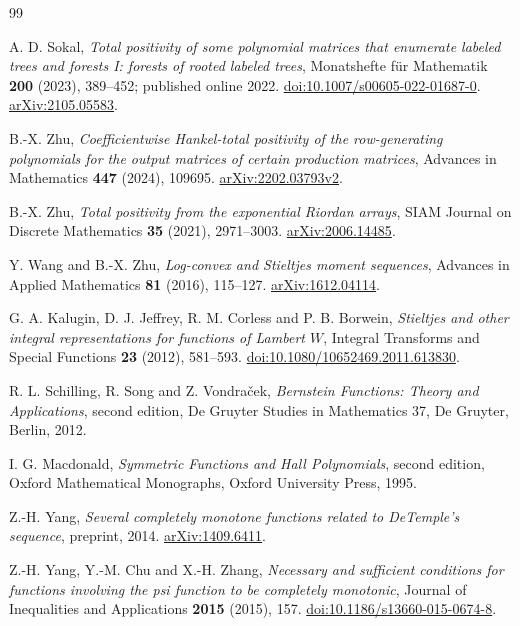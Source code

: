 \documentclass[11pt,a4paper]{article}
\theoremstyle{definition}
\theoremstyle{remark}
\numberwithin{equation}{section}
\begin{document}
\begin{thebibliography}{99}
\setlength{\itemsep}{2pt plus .3pt minus .3pt}

A. D. Sokal,
\emph{Total positivity of some polynomial matrices that enumerate labeled
trees and forests I: forests of rooted labeled trees},
Monatshefte f\"ur Mathematik \textbf{200} (2023), 389--452;
published online 2022.
\href{https://doi.org/10.1007/s00605-022-01687-0}{doi:10.1007/s00605-022-01687-0}.
\href{https://arxiv.org/abs/2105.05583}{arXiv:2105.05583}.

B.-X. Zhu,
\emph{Coefficientwise Hankel-total positivity of the row-generating
polynomials for the output matrices of certain production matrices},
Advances in Mathematics \textbf{447} (2024), 109695.
\href{https://arxiv.org/abs/2202.03793v2}{arXiv:2202.03793v2}.

B.-X. Zhu,
\emph{Total positivity from the exponential Riordan arrays},
SIAM Journal on Discrete Mathematics \textbf{35} (2021), 2971--3003.
\href{https://arxiv.org/abs/2006.14485}{arXiv:2006.14485}.

Y. Wang and B.-X. Zhu,
\emph{Log-convex and Stieltjes moment sequences},
Advances in Applied Mathematics \textbf{81} (2016), 115--127.
\href{https://arxiv.org/abs/1612.04114}{arXiv:1612.04114}.

G. A. Kalugin, D. J. Jeffrey, R. M. Corless and P. B. Borwein,
\emph{Stieltjes and other integral representations for functions of Lambert
$W$}, Integral Transforms and Special Functions \textbf{23} (2012), 581--593.
\href{https://doi.org/10.1080/10652469.2011.613830}{doi:10.1080/10652469.2011.613830}.

R. L. Schilling, R. Song and Z. Vondra\v{c}ek,
\emph{Bernstein Functions: Theory and Applications}, second edition,
De Gruyter Studies in Mathematics 37, De Gruyter, Berlin, 2012.

I. G. Macdonald,
\emph{Symmetric Functions and Hall Polynomials}, second edition,
Oxford Mathematical Monographs, Oxford University Press, 1995.

Z.-H. Yang,
\emph{Several completely monotone functions related to DeTemple's sequence},
preprint, 2014.
\href{https://arxiv.org/abs/1409.6411}{arXiv:1409.6411}.

Z.-H. Yang, Y.-M. Chu and X.-H. Zhang,
\emph{Necessary and sufficient conditions for functions involving the psi
function to be completely monotonic},
Journal of Inequalities and Applications \textbf{2015} (2015), 157.
\href{https://doi.org/10.1186/s13660-015-0674-8}{doi:10.1186/s13660-015-0674-8}.


\end{thebibliography}
\end{document}
